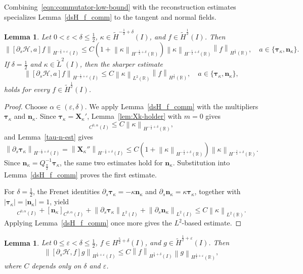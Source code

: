 \documentclass[11pt,reqno]{amsart}
\theoremstyle{plain}
\newtheorem{lemma}[theorem]{Lemma}
\theoremstyle{definition}
\numberwithin{equation}{section}
\newcommand{\paren}[1]{\left(#1\right)}
\newcommand{\p}{\partial}
\newcommand{\mc}[1]{\mathcal{#1}}
\newcommand{\wt}[1]{\widetilde{#1}}
\newcommand{\bm}[1]{\boldsymbol{#1}}
\newcommand{\abs}[1]{\left\lvert #1 \right\rvert}
\newcommand{\norm}[1]{\left\lVert #1 \right\rVert}
\newcommand{\R}{\mathbb{R}}
\newcommand{\tk}{\bm\tau_\kappa}
\newcommand{\nk}{\bm n_\kappa}
\newcommand{\xk}{\bm X_\kappa}
\newcommand{\ci}[1]{C^{#1}(I)}
\newcommand{\hi}[1]{H^{#1}(I)}
\newcommand{\thi}[1]{\wt H^{#1}(I)}
\newcommand{\hr}[1]{H^{#1}(\R)}
\begin{document}
Combining~\eqref{eqn:commutator-low-bound} with the reconstruction estimates
specializes Lemma~\ref{dsH_f_comm} to the tangent and normal fields.
\begin{lemma}\label{lem:tn-comm}
Let $0<\varepsilon<\delta\le\frac12$,
$\kappa\in\thi{-\frac12+\delta}$, and $f\in\thi{\frac12}$. Then
\begin{equation}
    \norm{[\p_s\mc H,a]f}_{\hi{-\frac12+\varepsilon}}
    \le C\paren{1+\norm{\kappa}_{\hr{-\frac12+\delta}}}
    \norm{\kappa}_{\hr{-\frac12+\delta}}
    \norm{f}_{\hr{\frac12}},\quad a\in\{\tk,\nk\}.
\end{equation}
If $\delta=\frac12$ and $\kappa\in\wt L^2(I)$, then the sharper estimate
\begin{equation}
    \norm{[\p_s\mc H,a]f}_{\hi{-\frac12+\varepsilon}}
    \le C\norm{\kappa}_{L^2(\R)}\norm{f}_{\hr{\frac12}},
    \quad a\in\{\tk,\nk\},
\end{equation}
holds for every $f\in\thi{\frac12}$.
\end{lemma}
\begin{proof}
Choose $\alpha\in(\varepsilon,\delta)$. We apply
Lemma~\ref{dsH_f_comm} with the multipliers $\tk$ and $\nk$.
Since $\tk=\xk'$, Lemma~\ref{lem:Xk-holder} with $m=0$ gives
\begin{equation}
    [\tk]_{\ci{0,\alpha}}\le C\norm{\kappa}_{\hr{-\frac12+\delta}},
\end{equation}
and Lemma~\ref{tau-n-est} gives
\begin{equation}
    \norm{\p_s\tk}_{\hi{-\frac12+\delta}}
    =\norm{\xk''}_{\hi{-\frac12+\delta}}
    \le C\paren{1+\norm{\kappa}_{\hr{-\frac12+\delta}}}
        \norm{\kappa}_{\hr{-\frac12+\delta}}.
\end{equation}
Since $\nk=Q_{\frac{\pi}{2}}^{-1}\tk$, the same two estimates hold for
$\nk$. Substitution into Lemma~\ref{dsH_f_comm} proves the first estimate.

For $\delta=\frac12$, the Frenet identities
$\p_s\tk=-\kappa\nk$ and $\p_s\nk=\kappa\tk$, together with
$\abs{\tk}=\abs{\nk}=1$, yield
\begin{equation}
    [\tk]_{\ci{0,\alpha}}+[\nk]_{\ci{0,\alpha}}
    +\norm{\p_s\tk}_{L^2(I)}+\norm{\p_s\nk}_{L^2(I)}
    \le C\norm{\kappa}_{L^2(\R)}.
\end{equation}
Applying Lemma~\ref{dsH_f_comm} once more gives the $L^2$-based estimate.
\end{proof}


\begin{lemma}\label{lem:comm-psH}
Let $0\le\varepsilon<\delta\le\frac12$,
$f\in H^{\frac52+\delta}(I)$, and
$g\in\thi{\frac12+\varepsilon}$. Then
\begin{equation}\label{eq:comm-psH-bound}
    \norm{[\p_s\mc H,f]g}_{\hi{\frac12+\varepsilon}}
    \le C\norm{f}_{H^{\frac52+\delta}(I)}
    \norm{g}_{\hr{\frac12+\varepsilon}},
\end{equation}
where $C$ depends only on $\delta$ and $\varepsilon$.
\end{lemma}
\end{document}
